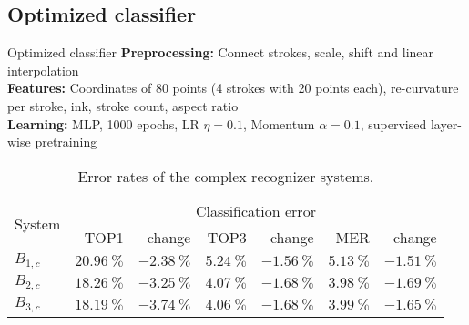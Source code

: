 \subsection{Optimized classifier}
\begin{frame}{Optimized classifier}
    \textbf{Preprocessing:} Connect strokes{\color{light-gray}, scale, shift and linear interpolation}\\
    \textbf{Features:} {\color{light-gray}Coordinates of 80 points (4 strokes with 20 points each),} re-curvature per stroke, ink, stroke count, aspect ratio\\
    \textbf{Learning:} {\color{light-gray}MLP, 1000 epochs, LR $\eta=0.1$, Momentum $\alpha=0.1$,} supervised layer-wise pretraining
\begin{table}[htb]
    \centering
    \begin{tabular}{lrrrrrr}
    \toprule
    \multirow{2}{*}{System}  & \multicolumn{6}{c}{Classification error}\\
    \cmidrule(l){2-7}
              & TOP1                   & change                 & TOP3                  & change                 & MER                   & change \\\midrule
    $B_{1,c}$ & $\SI{20.96}{\percent}$ & $\SI{-2.38}{\percent}$ & $\SI{5.24}{\percent}$ & $\SI{-1.56}{\percent}$ & $\SI{5.13}{\percent}$ & $\SI{-1.51}{\percent}$ \\
    $B_{2,c}$ & $\SI{18.26}{\percent}$ & $\SI{-3.25}{\percent}$ & $\SI{4.07}{\percent}$ & $\SI{-1.68}{\percent}$ & \underline{$\SI{3.98}{\percent}$} & $\SI{-1.69}{\percent}$ \\
    $B_{3,c}$ & \underline{$\SI{18.19}{\percent}$} & $\SI{-3.74}{\percent}$ & \underline{$\SI{4.06}{\percent}$} & $\SI{-1.68}{\percent}$ & $\SI{3.99}{\percent}$ & $\SI{-1.65}{\percent}$ \\
    \bottomrule
    \end{tabular}
    \caption{Error rates of the complex recognizer systems.}
\label{table:complex-recognizer-systems-evaluation}
\end{table}
\end{frame}